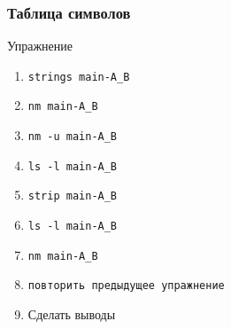 \begin{frame}
	\frametitle{Таблица символов}

	\begin{block}{Упражнение}
		\begin{enumerate}
			\item {\tt strings main-A\_B}
			\item {\tt nm main-A\_B}
			\item {\tt nm -u main-A\_B}
			\item {\tt ls -l main-A\_B}
			\item {\tt strip main-A\_B}
			\item {\tt ls -l main-A\_B}
			\item {\tt nm main-A\_B}
			\item {\tt повторить предыдущее упражнение}
			\item Сделать выводы
		\end{enumerate}
	\end{block}

\end{frame}

